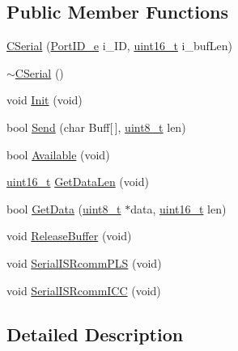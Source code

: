 \subsection*{Public Member Functions}
\begin{DoxyCompactItemize}
\item 
\mbox{\hyperlink{class_c_serial_a3b2b31de1529b884b8d5e354586ee981}{C\+Serial}} (\mbox{\hyperlink{class_c_serial_a000039540cc90b18bafacf5744e7eda2}{Port\+I\+D\+\_\+e}} i\+\_\+\+ID, \mbox{\hyperlink{_a_d_a_s___types_8h_a1f1825b69244eb3ad2c7165ddc99c956}{uint16\+\_\+t}} i\+\_\+buf\+Len)
\item 
\mbox{\hyperlink{class_c_serial_aff5444dd7e6a9ddc43cbce0e959edf7a}{$\sim$\+C\+Serial}} ()
\item 
void \mbox{\hyperlink{class_c_serial_aed500bd204c4b37665d6d228333edafb}{Init}} (void)
\item 
bool \mbox{\hyperlink{class_c_serial_ae5bec6d6a1c75839ae02cf0069d1f08e}{Send}} (char Buff\mbox{[}$\,$\mbox{]}, \mbox{\hyperlink{_a_d_a_s___types_8h_aba7bc1797add20fe3efdf37ced1182c5}{uint8\+\_\+t}} len)
\item 
bool \mbox{\hyperlink{class_c_serial_abb43734223d937a86e7616636ea16024}{Available}} (void)
\item 
\mbox{\hyperlink{_a_d_a_s___types_8h_a1f1825b69244eb3ad2c7165ddc99c956}{uint16\+\_\+t}} \mbox{\hyperlink{class_c_serial_a4327d6041fe9a390612b214709027cbb}{Get\+Data\+Len}} (void)
\item 
bool \mbox{\hyperlink{class_c_serial_abad86c07f530569b2ceeea75bda485ad}{Get\+Data}} (\mbox{\hyperlink{_a_d_a_s___types_8h_aba7bc1797add20fe3efdf37ced1182c5}{uint8\+\_\+t}} $\ast$data, \mbox{\hyperlink{_a_d_a_s___types_8h_a1f1825b69244eb3ad2c7165ddc99c956}{uint16\+\_\+t}} len)
\item 
void \mbox{\hyperlink{class_c_serial_a941e5cae2ca04518925a3b32f51110a6}{Release\+Buffer}} (void)
\item 
void \mbox{\hyperlink{class_c_serial_a707841754d94fc1ab6679f52bf413d85}{Serial\+I\+S\+Rcomm\+P\+LS}} (void)
\item 
void \mbox{\hyperlink{class_c_serial_a974812db5ced18cb9a6a73dc9034e7c8}{Serial\+I\+S\+Rcomm\+I\+CC}} (void)
\end{DoxyCompactItemize}


\subsection{Detailed Description}


